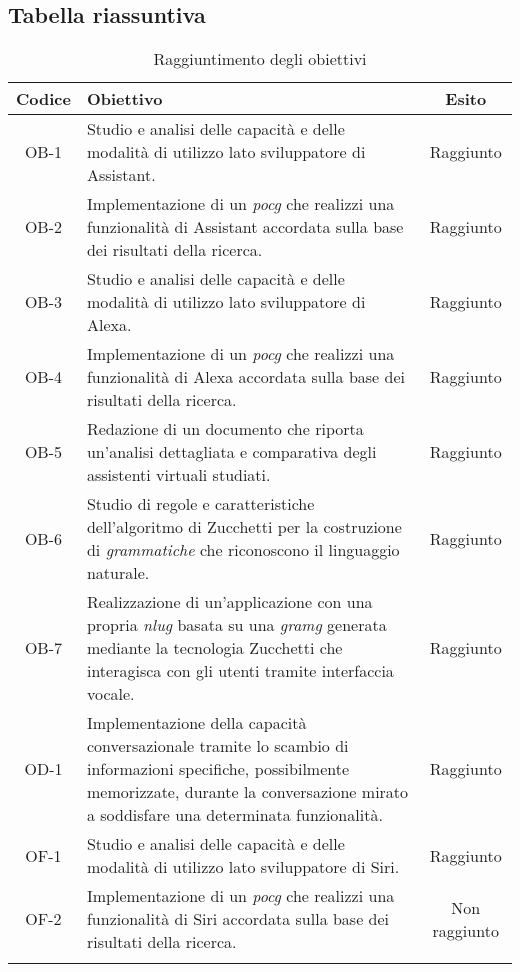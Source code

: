 \subsection{Tabella riassuntiva}
	\begin{longtable}{|c|p{8.5cm}|c|}
		\hline
		\textbf{Codice} & \textbf{Obiettivo} & \textbf{Esito} \\
		\hline
		OB-1 & Studio e analisi delle capacità e delle modalità di utilizzo lato sviluppatore di Assistant. & Raggiunto \\
		\hline
		OB-2 & Implementazione di un \emph{\gls{pocg}} che realizzi una funzionalità di Assistant accordata sulla base dei risultati della ricerca. & Raggiunto \\
		\hline
		OB-3 & Studio e analisi delle capacità e delle modalità di utilizzo lato sviluppatore di Alexa. & Raggiunto \\
		\hline
		OB-4 & Implementazione di un \emph{\gls{pocg}} che realizzi una funzionalità di Alexa accordata sulla base dei risultati della ricerca. & Raggiunto \\
		\hline
		OB-5 & Redazione di un documento che riporta un'analisi dettagliata e comparativa degli assistenti virtuali studiati. & Raggiunto \\
		\hline
		OB-6 & Studio di regole e caratteristiche dell'algoritmo di Zucchetti per la costruzione di \emph{grammatiche} che riconoscono il linguaggio naturale. & Raggiunto \\
		\hline
		OB-7 & Realizzazione di un'applicazione con una propria \emph{\gls{nlug}} basata su una \emph{\gls{gramg}} generata mediante la tecnologia Zucchetti che interagisca con gli utenti tramite interfaccia vocale. & Raggiunto \\
		\hline
		OD-1 & Implementazione della capacità conversazionale tramite lo scambio di informazioni specifiche, possibilmente memorizzate, durante la conversazione mirato a soddisfare una determinata funzionalità. & Raggiunto \\	
		\hline
		OF-1 & Studio e analisi delle capacità e delle modalità di utilizzo lato sviluppatore di Siri. & Raggiunto \\	
		\hline
		OF-2 & Implementazione di un \emph{\gls{pocg}} che realizzi una funzionalità di Siri accordata sulla base dei risultati della ricerca. & Non raggiunto\\	
		\hline
		\caption{Raggiuntimento degli obiettivi}
	\end{longtable}
